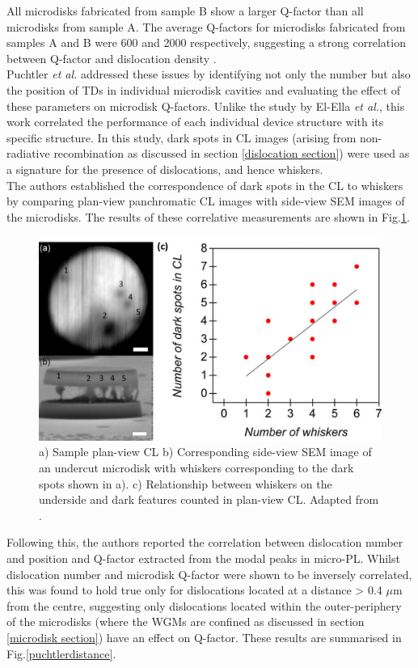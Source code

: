 All microdisks fabricated from sample B show a larger Q-factor than all microdisks from sample A. The average Q-factors for microdisks fabricated from samples A and B were 600 and 2000 respectively, suggesting a strong correlation between Q-factor and dislocation density \cite{El-Ella2011}.\\
Puchtler \textit{et al.} addressed these issues by identifying not only the number but also the position of TDs in individual microdisk cavities and evaluating the effect of these parameters on microdisk Q-factors\cite{Puchtler2015}.  Unlike the study by El-Ella \textit{et al.}, this work correlated the performance of each individual device structure with its specific structure. In this study, dark spots in CL images (arising from non-radiative recombination as discussed in section \ref{dislocation section}) were used as a signature for the presence of dislocations, and hence whiskers.\\
The authors established the correspondence of dark spots in the CL to whiskers by comparing plan-view panchromatic CL images with side-view SEM images of the microdisks. The results of these correlative measurements are shown in Fig.\ref{puchtlerdislocation}.

\begin{figure}[h]
	\centering
	\includegraphics[width=1\textwidth]{Figs/Ch4/puchtlerdislocation.png}
	\caption {a) Sample plan-view CL b) Corresponding side-view SEM image of an undercut microdisk with whiskers corresponding to the dark spots shown in a). c) Relationship between whiskers on the underside and dark features counted in plan-view CL. Adapted from \cite{Puchtler2015}.}
	\label{puchtlerdislocation}
\end{figure}
\FloatBarrier 

Following this, the authors reported the correlation between dislocation number and position and Q-factor extracted from the modal peaks in micro-PL. Whilst dislocation number and microdisk Q-factor were shown to be inversely correlated, this was found to hold true only for dislocations located at a distance > 0.4 $\mu$m from the centre, suggesting only dislocations located within the outer-periphery of the microdisks (where the WGMs are confined as discussed in section \ref{microdisk section}) have an effect on Q-factor. These results are summarised in Fig.\ref{puchtlerdistance}.


